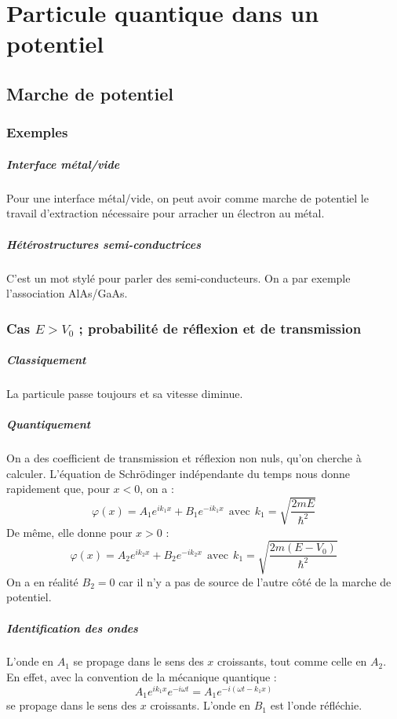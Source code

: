 \documentclass[french]{book}
\theoremstyle{plain}
\theoremstyle{definition}
\theoremstyle{remark}
\begin{document}
\chapter{Particule quantique dans un potentiel}
\localtableofcontents
\section{Marche de potentiel}
\subsection{Exemples}
\paragraph{Interface métal/vide} Pour une interface métal/vide, on peut avoir comme marche de potentiel le travail d'extraction nécessaire pour arracher un électron au métal.
\paragraph{Hétérostructures semi-conductrices} C'est un mot stylé pour parler des semi-conducteurs. On a par exemple l'association AlAs/GaAs.
\subsection{Cas $E>V_0$ ; probabilité de réflexion et de transmission}
\paragraph{Classiquement} La particule passe toujours et sa vitesse diminue. \paragraph{Quantiquement} On a des coefficient de transmission et réflexion non nuls, qu'on cherche à calculer. L'équation de Schrödinger indépendante du temps nous donne rapidement que, pour $x<0$, on a : $$\varphi(x)=A_1e^{ik_1x}+B_1e^{-ik_1x}\ \ \text{avec} \ \ k_1=\sqrt{\frac{2mE}{\hbar^2}}$$ De même, elle donne pour $x>0$ : $$\varphi(x)=A_2e^{ik_2x}+B_2e^{-ik_2x}\ \ \text{avec} \ \ k_1=\sqrt{\frac{2m(E-V_0)}{\hbar^2}}$$ On a en réalité $B_2=0$ car il n'y a pas de source de l'autre côté de la marche de potentiel.
\paragraph{Identification des ondes} L'onde en $A_1$ se propage dans le sens des $x$ croissants, tout comme celle en $A_2$. En effet, avec la convention de la mécanique quantique : $$A_1e^{ik_1x}e^{-i\omega t}=A_1e^{-i(\omega t-k_1x)}$$ se propage dans le sens des $x$ croissants. L'onde en $B_1$ est l'onde réfléchie.
\end{document}
